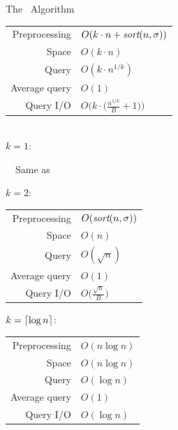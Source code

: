 \documentclass{beamer}
\begin{document}
\begin{frame}{The \fprintk\ Algorithm}
    \begin{tabular}{r l}
        Preprocessing & $O(k\cdot n + \textit{sort}(n,\sigma))$ \\
        Space & $O(k\cdot n)$\\
        Query & $O(k\cdot n^{1/k})$ \\
        Average query & $O(1)$ \\
        Query I/O & $O\Big(k\cdot\Big(\frac{n^{1/k}}{B}+1\Big)\Big)$ \\
    \end{tabular}

    \hfill\\$k=1$:

    ~~Same as 



    \begin{multicols}{2}{
        $k=2$:

        \begin{tabular}{r l}
            Preprocessing & $O(\textit{sort}(n,\sigma))$ \\
            Space & $O(n)$\\
            Query & $O(\sqrt n)$ \\
            Average query & $O(1)$ \\
            Query I/O & $O\Big(\frac{\sqrt n}{B}\Big)$ \\
        \end{tabular}
        \newpage
        $k=\lceil\log n\rceil$:

        \begin{tabular}{r l}
            Preprocessing & $O(n\log n)$ \\
            Space & $O(n\log n)$\\
            Query & $O(\log n)$ \\
            Average query & $O(1)$ \\
            Query I/O & $O(\log n)$ \\
        \end{tabular}
    }
    \end{multicols}
\end{frame}
\end{document}
